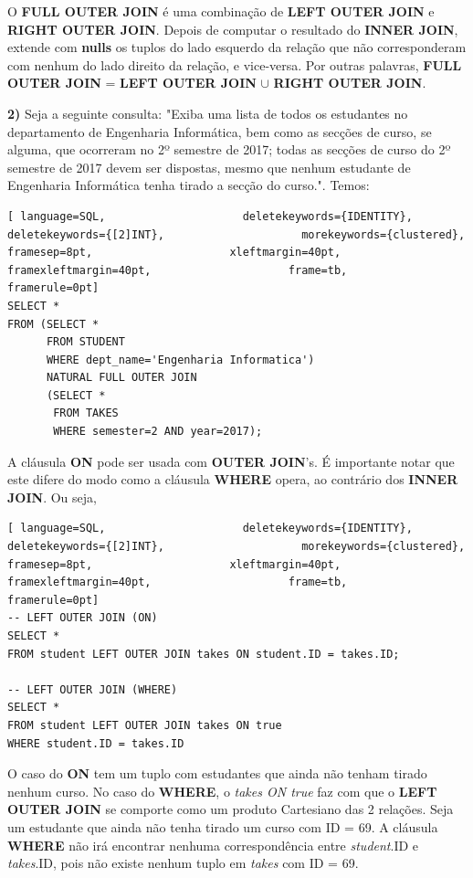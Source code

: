 \documentclass[titlepage]{book}
\theoremstyle{definition}
\begin{document}
O \textbf{FULL OUTER JOIN} é uma combinação de \textbf{LEFT OUTER JOIN} e \textbf{RIGHT OUTER JOIN}. Depois de computar o resultado do \textbf{INNER JOIN}, extende com \textbf{nulls} os tuplos do lado esquerdo da relação que não corresponderam com nenhum do lado direito da relação, e vice-versa. Por outras palavras, \textbf{FULL OUTER JOIN} = \textbf{LEFT OUTER JOIN} $\cup$ \textbf{RIGHT OUTER JOIN}.

\textbf{2)} Seja a seguinte consulta: "Exiba uma lista de todos os estudantes no departamento de Engenharia Informática, bem como as secções de curso, se alguma, que ocorreram no 2º semestre de 2017; todas as secções de curso do 2º semestre de 2017 devem ser dispostas, mesmo que nenhum estudante de Engenharia Informática tenha tirado a secção do curso.". Temos:
\begin{lstlisting}[ language=SQL,                     deletekeywords={IDENTITY},                     deletekeywords={[2]INT},                     morekeywords={clustered},                     framesep=8pt,                     xleftmargin=40pt,                     framexleftmargin=40pt,                     frame=tb,                     framerule=0pt]
SELECT *
FROM (SELECT *
      FROM STUDENT
      WHERE dept_name='Engenharia Informatica')
      NATURAL FULL OUTER JOIN
      (SELECT * 
       FROM TAKES
       WHERE semester=2 AND year=2017);
\end{lstlisting}

A cláusula \textbf{ON} pode ser usada com \textbf{OUTER JOIN}'s. É importante notar que este difere do modo como a cláusula \textbf{WHERE} opera, ao contrário dos \textbf{INNER JOIN}.
Ou seja,
\begin{lstlisting}[ language=SQL,                     deletekeywords={IDENTITY},                     deletekeywords={[2]INT},                     morekeywords={clustered},                     framesep=8pt,                     xleftmargin=40pt,                     framexleftmargin=40pt,                     frame=tb,                     framerule=0pt]
-- LEFT OUTER JOIN (ON)
SELECT *
FROM student LEFT OUTER JOIN takes ON student.ID = takes.ID;

-- LEFT OUTER JOIN (WHERE)
SELECT *
FROM student LEFT OUTER JOIN takes ON true
WHERE student.ID = takes.ID
\end{lstlisting}

O caso do \textbf{ON} tem um tuplo com estudantes que ainda não tenham tirado nenhum curso. No caso do \textbf{WHERE}, o \textit{takes ON true} faz com que o \textbf{LEFT OUTER JOIN} se comporte como um produto Cartesiano das 2 relações. Seja um estudante que ainda não tenha tirado um curso com ID = 69. A cláusula \textbf{WHERE} não irá encontrar nenhuma correspondência entre \textit{student}.ID e \textit{takes}.ID, pois não existe nenhum tuplo em \textit{takes} com ID = 69.
\end{document}
